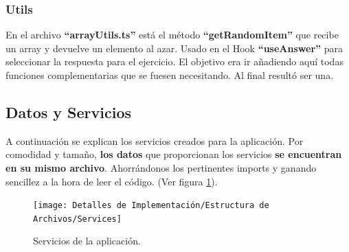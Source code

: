 \documentclass[12pt,twoside,titlepage]{report}
\begin{document}
\subsubsection{Utils}
En el archivo \textbf{``arrayUtils.ts''} está el método \textbf{``getRandomItem''} que recibe un array y devuelve un elemento al azar. Usado en el Hook \textbf{``useAnswer''} para seleccionar la respuesta para el ejercicio. El objetivo era ir añadiendo aquí todas funciones complementarias que se fuesen necesitando. Al final resultó ser una.

\subsection{Datos y Servicios}
A continuación se explican los servicios creados para la aplicación. Por comodidad y tamaño, \textbf{los datos} que proporcionan los servicios \textbf{se encuentran en su mismo archivo}. Ahorrándonos los pertinentes imports y ganando sencillez a la hora de leer el código.
(Ver figura \ref{fig:Services}).

\begin{figure}[H]
    \centering
    \texttt{[image: Detalles de Implementación/Estructura de Archivos/Services]}
    \caption{Servicios de la aplicación.}
    \label{fig:Services}
\end{figure}
\end{document}
